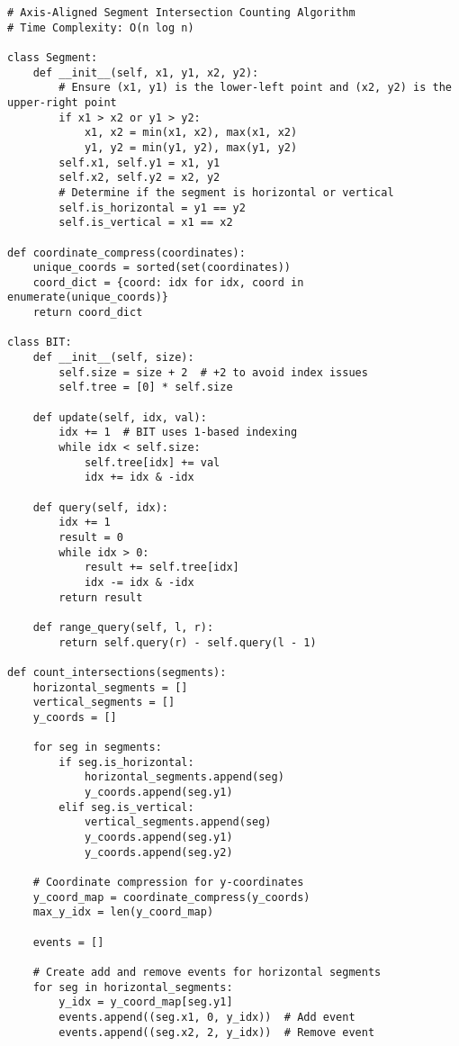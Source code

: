 \documentclass{article}
\begin{document}
\begin{verbatim}
# Axis-Aligned Segment Intersection Counting Algorithm
# Time Complexity: O(n log n)

class Segment:
    def __init__(self, x1, y1, x2, y2):
        # Ensure (x1, y1) is the lower-left point and (x2, y2) is the upper-right point
        if x1 > x2 or y1 > y2:
            x1, x2 = min(x1, x2), max(x1, x2)
            y1, y2 = min(y1, y2), max(y1, y2)
        self.x1, self.y1 = x1, y1
        self.x2, self.y2 = x2, y2
        # Determine if the segment is horizontal or vertical
        self.is_horizontal = y1 == y2
        self.is_vertical = x1 == x2

def coordinate_compress(coordinates):
    unique_coords = sorted(set(coordinates))
    coord_dict = {coord: idx for idx, coord in enumerate(unique_coords)}
    return coord_dict

class BIT:
    def __init__(self, size):
        self.size = size + 2  # +2 to avoid index issues
        self.tree = [0] * self.size

    def update(self, idx, val):
        idx += 1  # BIT uses 1-based indexing
        while idx < self.size:
            self.tree[idx] += val
            idx += idx & -idx

    def query(self, idx):
        idx += 1
        result = 0
        while idx > 0:
            result += self.tree[idx]
            idx -= idx & -idx
        return result

    def range_query(self, l, r):
        return self.query(r) - self.query(l - 1)

def count_intersections(segments):
    horizontal_segments = []
    vertical_segments = []
    y_coords = []

    for seg in segments:
        if seg.is_horizontal:
            horizontal_segments.append(seg)
            y_coords.append(seg.y1)
        elif seg.is_vertical:
            vertical_segments.append(seg)
            y_coords.append(seg.y1)
            y_coords.append(seg.y2)

    # Coordinate compression for y-coordinates
    y_coord_map = coordinate_compress(y_coords)
    max_y_idx = len(y_coord_map)

    events = []

    # Create add and remove events for horizontal segments
    for seg in horizontal_segments:
        y_idx = y_coord_map[seg.y1]
        events.append((seg.x1, 0, y_idx))  # Add event
        events.append((seg.x2, 2, y_idx))  # Remove event


\end{verbatim}
\end{document}
